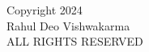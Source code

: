 \begin{center}
    \null
    \vfill
    \doublespacing
    Copyright 2024\\
    Rahul Deo Vishwakarma\\
    ALL RIGHTS RESERVED
    
\end{center}